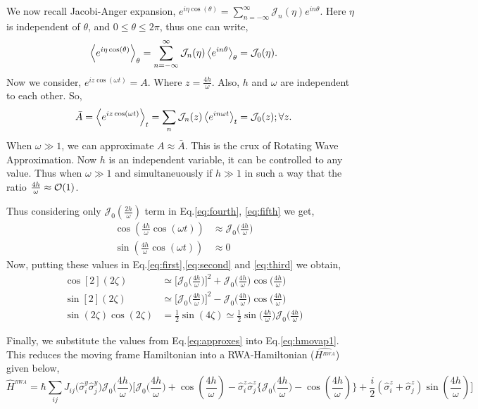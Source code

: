 \documentclass[%
reprint,
superscriptaddress,
amsmath,amssymb,showkeys,
aps,
prb,
]{revtex4-2}
\begin{document}
	We now recall Jacobi-Anger expansion, $\displaystyle e^{i\eta \cos(\theta)} = \sum_{n=-\infty}^{\infty} \mathcal{J}_n(\eta)e^{in\theta} $. Here $\eta$ is independent of $\theta$, and $0\leq\theta\leq 2\pi$, thus one can write,
	\begin{equation}
		\expval{e^{i\eta\cos(\theta)}}_{\theta} = \sum_{n=-\infty}^{\infty} \mathcal{J}_n(\eta) \expval{e^{in\theta}}_{\theta} =\mathcal{J}_0(\eta).
	\end{equation}
	Now we consider, $e^{iz \cos(\omega t)} = A$. Where $z = \frac{4h}{\omega}$. Also, $h$ and $\omega$ are independent to each other. So,
	\begin{equation}
		\bar{A} = \expval{e^{iz\cos(\omega t)}}_t = \sum_n\mathcal{J}_n(z)\expval{e^{i n \omega t}}_t = \mathcal{J}_0(z) ;  \forall{z}.
		\label{eq:jacang}
	\end{equation}
	When $\omega \gg 1$, we can approximate $A \approx \bar{A}$. This is the crux of Rotating Wave Approximation. Now $h$ is an independent variable, it can be controlled to any value. Thus when $\omega \gg 1$ and simultaneuously if $h \gg 1$ in such a way that the ratio $\frac{4h}{\omega} \approx \order{1}$.   
	
	Thus considering only $\mathcal{J}_0(\frac{2h}{\omega})$ term in Eq.\eqref{eq:fourth}, \eqref{eq:fifth} we get,
	\begin{align}
		\cos(\frac{4h}{\omega}\cos(\omega t)) &\approx \mathcal{J}_0\Big(\frac{4h}{\omega}\Big)\\
		\sin(\frac{4h}{\omega}\cos(\omega t)) &\approx 0
	\end{align}
	Now, putting these values in Eq.\eqref{eq:first},\eqref{eq:second} and \eqref{eq:third} we obtain,
	\begin{align}
	\cos[2](2\zeta) &\simeq \Big[\mathcal{J}_0\Big(\frac{4h}{\omega}\Big)\Big]^2 +  \mathcal{J}_0\Big(\frac{4h}{\omega}\Big) \cos\Big(\frac{4h}{\omega}\Big)\nonumber\\
	\sin[2](2\zeta) &\simeq \Big[\mathcal{J}_0\Big(\frac{4h}{\omega}\Big)\Big]^2 - \mathcal{J}_0\Big(\frac{4h}{\omega}\Big) \cos\Big(\frac{4h}{\omega}\Big) \nonumber\\
	\sin(2\zeta) \cos(2\zeta)&= \frac12 \sin(4\zeta) \simeq \frac12 \sin\Big(\frac{4h}{\omega}\Big) \mathcal{J}_0\Big(\frac{4h}{\omega}\Big)
	\label{eq:approxes}	
	\end{align}

	Finally, we substitute the values from Eq.\eqref{eq:approxes} into Eq.\eqref{eq:hmovap1}. This reduces the moving frame Hamiltonian into a RWA-Hamiltonian ($\hat{H^{_{RWA}}}$) given below,
	\begin{equation}
	\hat{H}^{_{RWA}} = \hbar\sum_{ij} J_{ij} \Big(\hat{\sigma}^y_i\hat{\sigma}^y_j\Big) \mathcal{J}_0\Big(\frac{4h}{\omega}\Big)\Bigg[\mathcal{J}_0\Big(\frac{4h}{\omega}\Big) + \cos(\frac{4h}{\omega}) -\hat{\sigma}^z_i\hat{\sigma}^z_j \Bigg\{\mathcal{J}_0\Big(\frac{4h}{\omega}\Big) - \cos(\frac{4h}{\omega})\Bigg\} + \frac{i}{2} (\hat{\sigma}^z_i + \hat{\sigma}^z_j) \sin(\frac{4h}{\omega})\Bigg]
	\end{equation}
\end{document}

